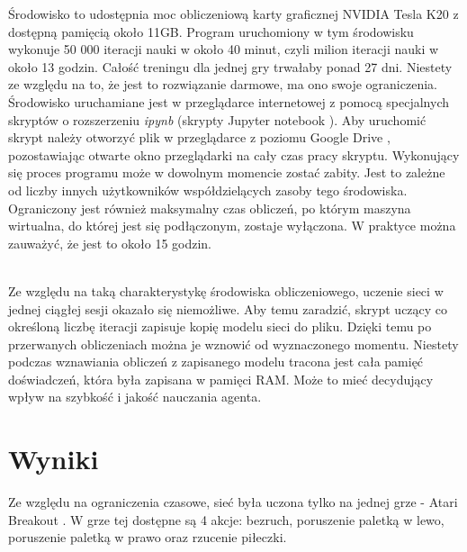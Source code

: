 \documentclass[12pt]{article}
\begin{document}
Środowisko to udostępnia moc obliczeniową karty graficznej NVIDIA Tesla K20 z dostępną pamięcią około 11GB. Program uruchomiony w tym środowisku wykonuje 50 000 iteracji nauki w około 40 minut, czyli milion iteracji nauki w około 13 godzin. Całość treningu dla jednej gry trwałaby ponad 27 dni. Niestety ze względu na to, że jest to rozwiązanie darmowe, ma ono swoje ograniczenia. Środowisko uruchamiane jest w przeglądarce internetowej z pomocą specjalnych skryptów o rozszerzeniu \textit{ipynb} (skrypty Jupyter notebook \cite{jupiter}). Aby uruchomić skrypt należy otworzyć plik w przeglądarce z poziomu Google Drive \cite{drive}, pozostawiając otwarte okno przeglądarki na cały czas pracy skryptu. Wykonujący się proces programu może w dowolnym momencie zostać zabity. Jest to zależne od liczby innych użytkowników współdzielących zasoby tego środowiska. Ograniczony jest również maksymalny czas obliczeń, po którym maszyna wirtualna, do której jest się podłączonym, zostaje wyłączona. W praktyce można zauważyć, że jest to około 15 godzin. 
\\\

Ze względu na taką charakterystykę środowiska obliczeniowego, uczenie sieci w jednej ciągłej sesji okazało się niemożliwe. Aby temu zaradzić, skrypt uczący co określoną liczbę iteracji zapisuje kopię modelu sieci do pliku. Dzięki temu po przerwanych obliczeniach można je wznowić od wyznaczonego momentu. Niestety podczas wznawiania obliczeń z zapisanego modelu tracona jest cała pamięć doświadczeń, która była zapisana w pamięci RAM. Może to mieć decydujący wpływ na szybkość i jakość nauczania agenta.


\section{Wyniki}
Ze względu na ograniczenia czasowe, sieć była uczona tylko na jednej grze - Atari Breakout \cite{breakout}. W grze tej dostępne są 4 akcje: bezruch, poruszenie paletką w lewo, poruszenie paletką w prawo oraz rzucenie piłeczki.
\end{document}
